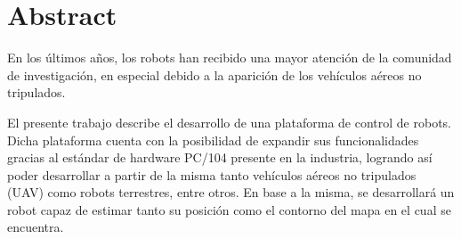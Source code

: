 \section*{Abstract}
\label{sec:1_abstract}

En los últimos años, los robots han recibido una mayor atención de la comunidad de investigación, en especial debido a la aparición de los vehículos aéreos no tripulados.

El presente trabajo describe el desarrollo de una plataforma de control de robots. Dicha plataforma cuenta con la posibilidad de expandir sus funcionalidades gracias al estándar de hardware PC/104 presente en la industria, logrando así poder desarrollar a partir de la misma tanto vehículos aéreos no tripulados (UAV) como robots terrestres, entre otros. En base a la misma, se desarrollará un robot capaz de estimar tanto su posición como el contorno del mapa en el cual se encuentra.
